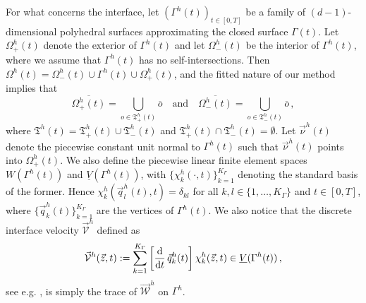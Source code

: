 \documentclass[a4paper,12pt,onecolumn]{article}
\newcommand{\W}{\vec{\mathcal W}}
\newcommand{\Vht}{\underline{V}(\Gamma^h(t))}
\newcommand{\Wht}{W(\Gamma^h(t))}
\newcommand{\ddt}{\frac{\rm d}{{\rm d}t}}
\newcommand{\V}{\vec{\mathcal{V}}} %
\begin{document}
For what concerns the interface, let $(\Gamma^h(t))_{t\in[0,T]}$  be a family of
$(d-1)$-dimensional polyhedral surfaces approximating the closed surface
$\Gamma(t)$. Let $\Omega^h_+(t)$ denote the exterior of $\Gamma^h(t)$ and let
$\Omega^h_-(t)$ be the interior of $\Gamma^h(t)$, where we assume that
$\Gamma^h(t)$ has no self-intersections. Then $\Omega^h(t) = \Omega_-^h(t) \cup
\Gamma^h(t) \cup \Omega_+^h(t)$, and the fitted nature of our method implies
that
\begin{equation} \label{eq:fittedO_ale}
\overline{\Omega^h_+(t)} = \bigcup_{o \in \mathfrak{T}^h_+(t)} \overline{o}
\quad\text{and}\quad
\overline{\Omega^h_-(t)} = \bigcup_{o \in \mathfrak{T}^h_-(t)} \overline{o} \,,
\end{equation}
where $\mathfrak{T}^h(t) = \mathfrak{T}^h_+(t) \cup \mathfrak{T}^h_-(t)$ and
$\mathfrak{T}^h_+(t) \cap \mathfrak{T}^h_-(t) = \emptyset$.
Let $\vec \nu^h(t)$ denote the piecewise constant unit normal to $\Gamma^h(t)$
such that $\vec\nu^h(t)$ points into $\Omega^h_+(t)$. We also define the
piecewise linear finite element spaces $\Wht$ and $\Vht$, with
$\{\chi^h_k(\cdot,t)\}_{k=1}^{K_\Gamma}$ denoting the standard basis of the
former. Hence $\chi^h_k(\vec q^h_l(t),t) = \delta_{kl}$ for all
$k,l \in \{1,\ldots,K_\Gamma\}$ and $t \in [0,T]$, where
$\{\vec q^h_k(t)\}_{k=1}^{K_\Gamma}$ are the vertices of $\Gamma^h(t)$. We also
notice that the discrete interface velocity $\V^h$ defined as
\begin{equation}\label{eq:Vsemidisc}
\V^h(\vec z, t):=
\sum_{k=1}^{K_\Gamma}\left[\ddt\,\vec q^h_k(t)\right] \chi^h_k(\vec z, t)
\in \Vht\,,
\end{equation}
see e.g. \cite[(3.3)]{tpfs}, is simply the trace of $\W^h$ on $\Gamma^h$.
\end{document}

